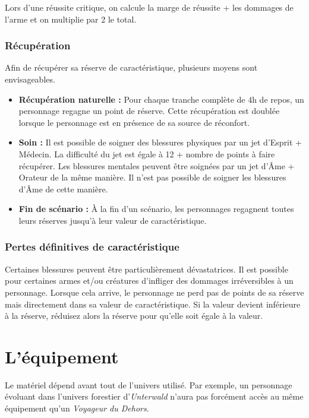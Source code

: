 \documentclass[a4paper,10pt,twoside,twocolumn,openany,bg=print,justified]{dndbook}
\begin{document}
Lors d'une réussite critique, on calcule la marge de réussite + les dommages de l'arme et on multiplie par 2 le total.

\subsection*{Récupération}

Afin de récupérer sa réserve de caractéristique, plusieurs moyens sont envisageables.

\begin{itemize}
\item \textbf{Récupération naturelle :} Pour chaque tranche complète de 4h de repos, un personnage regagne un point de réserve. Cette récupération est doublée lorsque le personnage est en présence de sa source de réconfort.
\item \textbf{Soin :} Il est possible de soigner des blessures physiques par un jet d'Esprit + Médecin. La difficulté du jet est égale à 12 + nombre de points à faire récupérer. Les blessures mentales peuvent être soignées par un jet d'Âme + Orateur de la même manière. Il n'est pas possible de soigner les blessures d'Âme de cette manière.
\item \textbf{Fin de scénario :} À la fin d'un scénario, les personnages regagnent toutes leurs réserves jusqu'à leur valeur de caractéristique.
\end{itemize}

\subsection*{Pertes définitives de caractéristique}

Certaines blessures peuvent être particulièrement dévastatrices. Il est possible pour certaines armes et/ou créatures d'infliger des dommages irréversibles à un personnage. Lorsque cela arrive, le personnage ne perd pas de points de sa réserve mais directement dans sa valeur de caractéristique. Si la valeur devient inférieure à la réserve, réduisez alors la réserve pour qu'elle soit égale à la valeur.

\newpage

\chapter{L'équipement}

Le matériel dépend avant tout de l'univers utilisé. Par exemple, un personnage évoluant dans l'univers forestier d'\emph{Unterwald} n'aura pas forcément accès au même équipement qu'un \emph{Voyageur du Dehors}.
\end{document}
